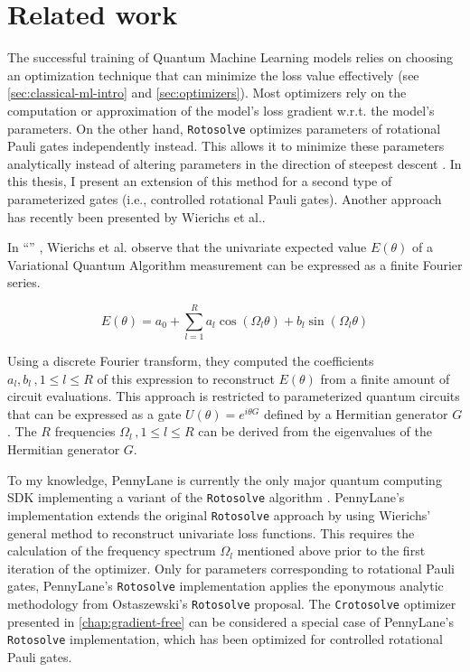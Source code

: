 \chapter{Related work}
\label{chap:related-work}

The successful training of Quantum Machine Learning models relies on choosing an
optimization technique that can minimize the loss value effectively (see
\autoref{sec:classical-ml-intro} and \autoref{sec:optimizers}).
Most optimizers rely on the computation or approximation of the model's loss
gradient w.r.t. the model's parameters.
On the other hand, \texttt{Rotosolve} optimizes parameters of rotational Pauli
gates independently instead.
This allows it to minimize these parameters analytically instead of altering
parameters in the direction of steepest descent
\cite{ostaszewski_structure_2021}.
In this thesis, I present an extension of this method for a second type of
parameterized gates (i.e., controlled rotational Pauli gates).
Another approach has recently been presented by Wierichs et al..

In ``\emph{}''
\cite{wierichs_general_2022}, Wierichs et al. observe that the univariate
expected value $E(\theta)$ of a Variational Quantum Algorithm measurement can be
expressed as a finite Fourier series.

$$E(\theta) = a_0 + \sum_{l=1}^R a_l \cos(\Omega_l \theta) + b_l \sin(\Omega_l \theta)$$

Using a discrete Fourier transform, they computed the coefficients
$a_l, b_l\,, 1 \leq l \leq R$ of this expression to reconstruct $E(\theta)$ from a
finite amount of circuit evaluations.
This approach is restricted to parameterized quantum circuits that can be
expressed as a gate $U(\theta) = e^{i \theta G}$ defined by a Hermitian
generator $G$.
The $R$ frequencies $\Omega_l\,, 1 \leq l \leq R$ can be derived from the
eigenvalues of the Hermitian generator $G$.

To my knowledge, PennyLane is currently the only major quantum computing SDK
implementing a variant of the \texttt{Rotosolve} algorithm
\cite{bergholm_pennylane_2018,ostaszewski_structure_2021}.
PennyLane's implementation extends the original \texttt{Rotosolve} approach by
using Wierichs' general method to reconstruct univariate loss functions.
This requires the calculation of the frequency spectrum $\Omega_l$ mentioned
above prior to the first iteration of the optimizer.
Only for parameters corresponding to rotational Pauli gates, PennyLane's
\texttt{Rotosolve} implementation applies the eponymous analytic methodology
from Ostaszewski's \texttt{Rotosolve} proposal.
The \texttt{Crotosolve} optimizer presented in \autoref{chap:gradient-free} can
be considered a special case of PennyLane's \texttt{Rotosolve} implementation,
which has been optimized for controlled rotational Pauli gates.
